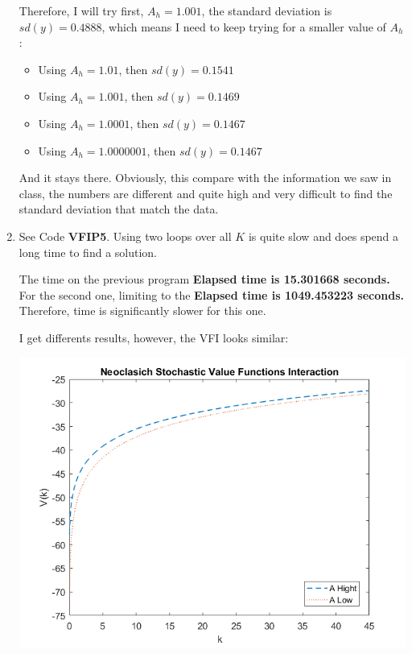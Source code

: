 \documentclass[12pt]{article}%
\begin{document}
\begin{enumerate}
	 Therefore, I will try first, $A_h=1.001$, the standard deviation is $sd(y)=0.4888$, which means I need to keep trying for a smaller value of $A_h$: 
	 
	 \begin{itemize}
	 		\item Using $A_h=1.01$, then  $sd(y)=0.1541$
	 	\item Using $A_h=1.001$, then  $sd(y)=0.1469$
	 	\item Using $A_h=1.0001$, then  $sd(y)=0.1467$
	 	\item Using $A_h=1.0000001$, then  $sd(y)=0.1467$
	 \end{itemize}
 
 And it stays there. Obviously, this compare with the information we saw in class, the numbers are different and quite high and very difficult to find the standard deviation that match the data.
	
	\item See Code \textbf{VFIP5}. Using two loops over all $K$ is quite slow and does spend a long time to find a solution. 
	
	The time on the previous program \textbf{Elapsed time is 15.301668 seconds.}
	For the second one, limiting to the  \textbf{Elapsed time is 1049.453223 seconds.} Therefore, time is significantly slower for this one. 
	
 I get differents results, however, the VFI looks similar: 
	
	\begin{center}
		\includegraphics[width=1\linewidth]{VFP5}
	\end{center}
	
\end{enumerate}

\strut

\onehalfspacing
\end{document}
